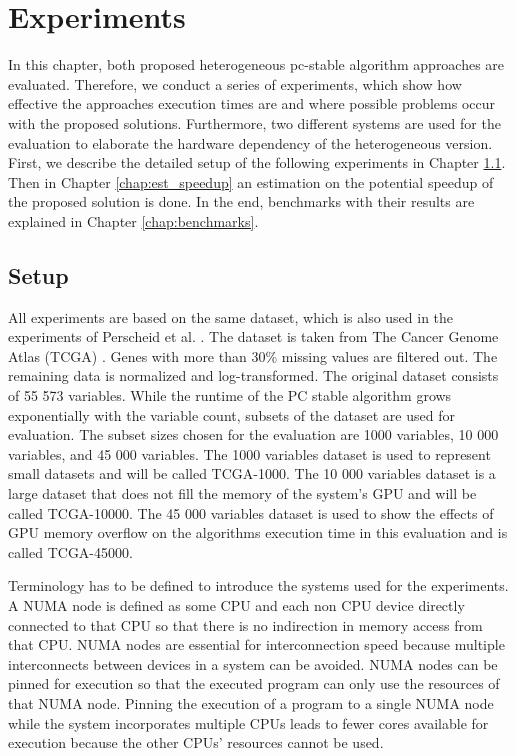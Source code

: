 \chapter{Experiments}
\label{chap:experiments}
In this chapter, both proposed heterogeneous pc-stable algorithm approaches are evaluated. Therefore, we conduct a series of experiments, which show how effective the approaches execution times are and where possible problems occur with the proposed solutions. Furthermore, two different systems are used for the evaluation to elaborate the hardware dependency of the heterogeneous version. First, we describe the detailed setup of the following experiments in Chapter \ref{chap:setup}. Then in Chapter \ref{chap:est_speedup} an estimation on the potential speedup of the proposed solution is done. In the end, benchmarks with their results are explained in Chapter \ref{chap:benchmarks}.

\section{Setup}
\label{chap:setup}
All experiments are based on the same dataset, which is also used in the experiments of Perscheid et al. \cite{perscheidIntegrativeGeneSelection2018}. The dataset is taken from The Cancer Genome Atlas (TCGA) \cite{weinsteinCancerGenomeAtlas2013}. Genes with more than 30\% missing values are filtered out. The remaining data is normalized and log-transformed. The original dataset consists of 55 573 variables. While the runtime of the PC stable algorithm grows exponentially with the variable count, subsets of the dataset are used for evaluation. The subset sizes chosen for the evaluation are 1000 variables, 10 000 variables, and 45 000 variables. The 1000 variables dataset is used to represent small datasets and will be called TCGA-1000. The 10 000 variables dataset is a large dataset that does not fill the memory of the system's GPU and will be called TCGA-10000. The 45 000 variables dataset is used to show the effects of GPU memory overflow on the algorithms execution time in this evaluation and is called TCGA-45000.

Terminology has to be defined to introduce the systems used for the experiments. A NUMA node is defined as some CPU and each non CPU device directly connected to that CPU so that there is no indirection in memory access from that CPU. NUMA nodes are essential for interconnection speed because multiple interconnects between devices in a system can be avoided. NUMA nodes can be pinned for execution so that the executed program can only use the resources of that NUMA node. Pinning the execution of a program to a single NUMA node while the system incorporates multiple CPUs leads to fewer cores available for execution because the other CPUs' resources cannot be used.

